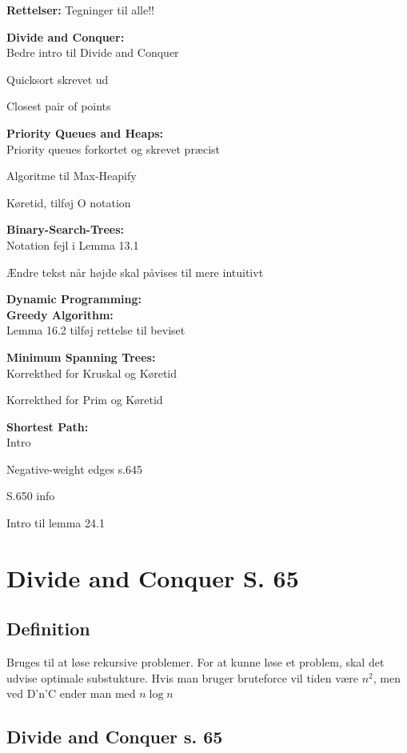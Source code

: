\documentclass[11pt,a4paper]{report}
\theoremstyle{plain}
\theoremstyle{definition}
\theoremstyle{remark}
\numberwithin{equation}{section}
\begin{document}
\textbf{Rettelser:}
Tegninger til alle!!

\textbf{Divide and Conquer:}\\
Bedre intro til Divide and Conquer

Quicksort skrevet ud

Closest pair of points

\textbf{Priority Queues and Heaps:}\\
Priority queues forkortet og skrevet præcist

Algoritme til Max-Heapify

Køretid, tilføj O notation

\textbf{Binary-Search-Trees:}\\
Notation fejl i Lemma 13.1

Ændre tekst når højde skal påvises til mere intuitivt

\textbf{Dynamic Programming:}\\

\textbf{Greedy Algorithm:}\\
Lemma 16.2 tilføj rettelse til beviset

\textbf{Minimum Spanning Trees:}\\
Korrekthed for Kruskal og Køretid

Korrekthed for Prim og Køretid

\textbf{Shortest Path:}\\
Intro

Negative-weight edges s.645

S.650 info

Intro til lemma 24.1

\newpage


\tableofcontents

\newpage

\chapter{Divide and Conquer S. 65}

\section{Definition}
Bruges til at løse rekursive problemer. For at kunne løse et problem, skal det udvise optimale substukture. Hvis man bruger bruteforce vil tiden være $n^2$, men ved D'n'C ender man med $n \log n$

\section{Divide and Conquer s. 65}
\end{document}
